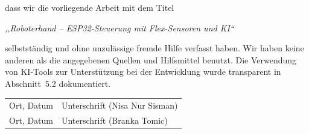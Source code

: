 \documentclass[12pt,a4paper]{article}
\begin{document}
\vspace{0.3cm}
dass wir die vorliegende Arbeit mit dem Titel

\vspace{0.3cm}
\textit{,,Roboterhand -- ESP32-Steuerung mit Flex-Sensoren und KI``}

\vspace{0.3cm}
selbstständig und ohne unzulässige fremde Hilfe verfasst haben. Wir haben keine anderen als die angegebenen Quellen und Hilfsmittel benutzt. Die Verwendung von KI-Tools zur Unterstützung bei der Entwicklung wurde transparent in Abschnitt~5.2 dokumentiert.

\vspace{2cm}
\noindent
\begin{tabular}{ll}
    Ort, Datum \hspace{4cm} & Unterschrift (Nisa Nur Sisman) \\[1.5cm]
    Ort, Datum \hspace{4cm} & Unterschrift (Branka Tomic) \\
\end{tabular}
\end{document}
